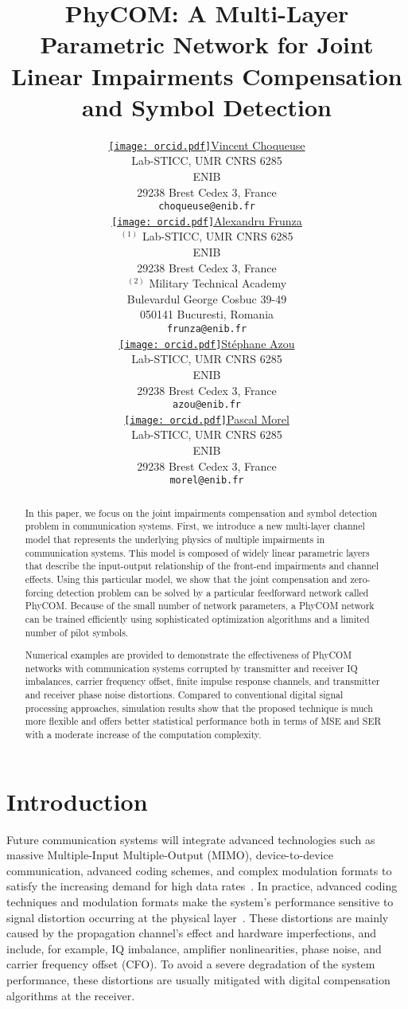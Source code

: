 \documentclass{article}
\author{ \href{https://orcid.org/0000-0002-2532-7486}{\texttt{[image: orcid.pdf]}\hspace{1mm}Vincent Choqueuse}\\
	Lab-STICC, UMR CNRS 6285\\
	ENIB\\
	29238 Brest Cedex 3, France  \\
	\texttt{choqueuse@enib.fr} \\
	\And
	\href{https://orcid.org/0000-0001-6149-0195}{\texttt{[image: orcid.pdf]}\hspace{1mm}Alexandru Frunza} \\
	$^{(1)}$ Lab-STICC, UMR CNRS 6285\\
	ENIB\\
	29238 Brest Cedex 3, France  \\
	$^{(2)}$ Military Technical Academy\\
	Bulevardul George Cosbuc 39-49\\
	050141 Bucuresti, Romania\\
	\texttt{frunza@enib.fr} \\
	\And
	\href{https://orcid.org/0000-0001-8185-7134}{\texttt{[image: orcid.pdf]}\hspace{1mm}St\'ephane Azou} \\
	Lab-STICC, UMR CNRS 6285\\
	ENIB\\
	29238 Brest Cedex 3, France  \\
	\texttt{azou@enib.fr} \\
	\And
	\href{https://orcid.org/0000-0002-6671-1185}{\texttt{[image: orcid.pdf]}\hspace{1mm}Pascal Morel} \\
	Lab-STICC, UMR CNRS 6285\\
	ENIB\\
	29238 Brest Cedex 3, France  \\
	\texttt{morel@enib.fr} \\
}
\title{PhyCOM: A Multi-Layer Parametric Network for Joint Linear Impairments Compensation and Symbol Detection}
\begin{document}
\maketitle


\begin{abstract}
In this paper, we focus on the joint impairments compensation and symbol detection problem in communication systems. First, we introduce a new multi-layer channel model that represents the underlying physics of multiple impairments in communication systems. This model is composed of widely linear parametric layers that describe the input-output relationship of the front-end impairments and channel effects. Using this particular model, we show that the joint compensation and zero-forcing detection problem can be solved by a particular feedforward network called PhyCOM. Because of the small number of network parameters, a PhyCOM network can be trained efficiently using sophisticated optimization algorithms and a limited number of pilot symbols.

Numerical examples are provided to demonstrate the effectiveness of PhyCOM networks with communication systems corrupted by transmitter and receiver IQ imbalances, carrier frequency offset, finite impulse response channels, and transmitter and receiver phase noise distortions. Compared to conventional digital signal processing approaches, simulation results show that the proposed technique is much more flexible and offers better statistical performance both in terms of MSE and SER with a moderate increase of the computation complexity.\end{abstract}




\section{Introduction}

Future communication systems will integrate advanced technologies such as massive Multiple-Input Multiple-Output (MIMO), device-to-device communication, advanced coding schemes, and complex modulation formats to satisfy the increasing demand for high data rates~\cite{ELI15,BAS16,ZHA16,SHA17}. In practice, advanced coding techniques and modulation formats make the system's performance sensitive to signal distortion occurring at the physical layer~\cite{ELI15,WAN17}. These distortions are mainly caused by the propagation channel's effect and hardware imperfections, and include, for example, IQ imbalance, amplifier nonlinearities, phase noise, and carrier frequency offset (CFO). To avoid a severe degradation of the system performance, these distortions are usually mitigated with digital compensation algorithms at the receiver.
\end{document}

